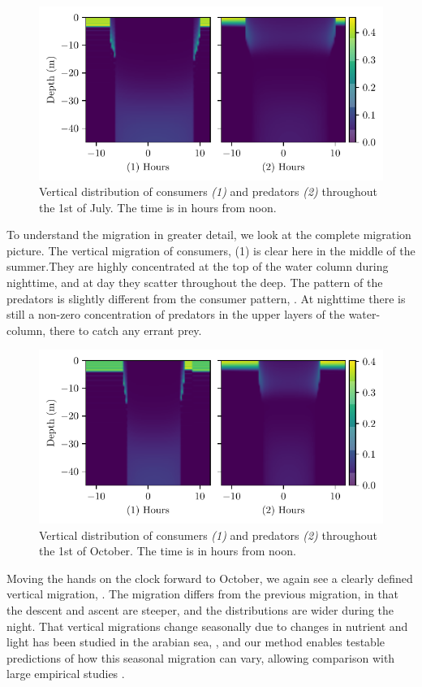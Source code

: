 \begin{figure}[H]
\includegraphics{plots/heatmapsday90_nonrandom.pdf}
\caption{Vertical distribution of consumers \emph{(1)} and predators \emph{(2)} throughout the 1st of July. The time is in hours from noon. }
\label{fig:heatmaps_90_nonrandom}
\end{figure}
To understand the migration in greater detail, we look at the complete migration picture.
The vertical migration of consumers, (1) is clear here in the middle of the summer.They are highly concentrated at the top of the water column during nighttime, and at day they scatter throughout the deep. The pattern of the predators is slightly different from the consumer pattern, . At nighttime there is still a non-zero concentration of predators in the upper layers of the water-column, there to catch any errant prey.
\begin{figure}[H]
\includegraphics{plots/heatmapsday180_nonrandom.pdf}
\caption{Vertical distribution of consumers \emph{(1)} and predators \emph{(2)} throughout the 1st of October. The time is in hours from noon.}
\label{fig:heatmaps_180_nonrandom}
\end{figure}
Moving the hands on the clock forward to October, we again see a clearly defined vertical migration, . The migration differs from the previous migration, in that the descent and ascent are steeper, and the distributions are wider during the night. That vertical migrations change seasonally due to changes in nutrient and light has been studied in the arabian sea, \citep{wang2014seasonal}, and our method enables testable predictions of how this seasonal migration can vary, allowing comparison with large empirical studies \citep{klevjer2016large}.
